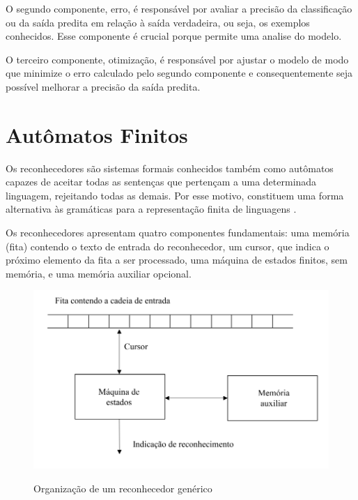 O segundo componente, erro, é responsável por avaliar a precisão da classificação ou da saída predita em relação à saída verdadeira, ou seja, os exemplos conhecidos. Esse componente é crucial porque permite uma analise do modelo.


O terceiro componente, otimização, é responsável por ajustar o modelo de modo que  minimize o  erro calculado pelo segundo componente e consequentemente seja possível melhorar a precisão da saída predita. 



\section[Autômatos Finitos]{Autômatos Finitos}


Os reconhecedores são sistemas formais conhecidos também como autômatos capazes de aceitar todas as sentenças que pertençam a uma determinada linguagem, rejeitando todas as demais. Por esse motivo, constituem uma forma alternativa às gramáticas para a representação finita de linguagens \cite{reconhecimento}.

Os reconhecedores apresentam quatro componentes fundamentais: uma memória (fita) contendo o texto de entrada do
reconhecedor, um cursor, que indica o próximo elemento da fita a ser processado, uma máquina de estados finitos, sem memória, e uma memória auxiliar opcional.


\begin{figure}[!htb]
	\centering
    \caption{Organização de um reconhecedor genérico}
	\includegraphics[scale=2]{figuras/AFD/reconhecedor.png}
	\label{fig:Organizacao de um reconhecedor generico}
\end{figure}


